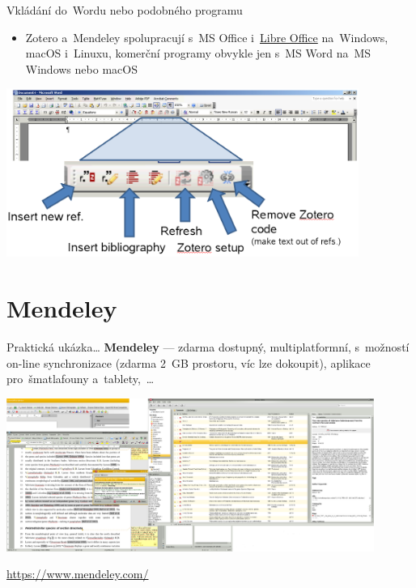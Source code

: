 \documentclass[compress, ucs, xelatex, 11pt, xcolor=svgnames, aspectratio=169,
	hyperref={
		bookmarks=true,
		unicode=true,
		colorlinks=true,
		pdftitle={Citacni software},
		plainpages=false,
		pdfauthor={Vojtech Zeisek},
		pdfsubject={Kratky uvod do citacniho software},
		pdfcreator={XeLaTeX},
		pdfkeywords={citace, reference, software, literatura},
		linkcolor=Crimson, %
		anchorcolor=Magenta, %
		citecolor=Magenta, %
		filecolor=Magenta, %
		menucolor=Magenta, %
		urlcolor=DarkTurquoise, %
		pdftex},
	url={hyphens, lowtilde} %
	]{beamer}
\begin{document}
\begin{frame}{Vkládání do~Wordu nebo podobného programu}
	\begin{itemize}
		\item Zotero a~Mendeley spolupracují s~MS Office i~\href{https://cs.libreoffice.org/}{Libre Office} na~Windows, macOS i~Linuxu, komerční programy obvykle jen s~MS Word na~MS Windows nebo macOS
	\end{itemize}
	\begin{center}
		\includegraphics[height=5.5cm]{zotero_lista.png}
	\end{center}
\end{frame}

\section{Mendeley}

\begin{frame}{Praktická ukázka\ldots}
	\textbf{Mendeley} --- zdarma dostupný, multiplatformní, s~možností on-line synchronizace (zdarma 2~GB prostoru, víc lze dokoupit), aplikace pro~šmatlafouny a~tablety,~\ldots\\
	\begin{center}
		\includegraphics[height=5cm]{mendeley.png}
	\end{center}
	\flushright\url{https://www.mendeley.com/}
\end{frame}
\end{document}
